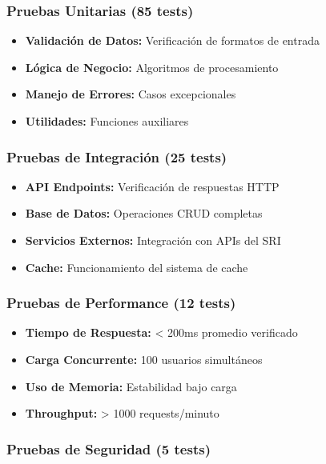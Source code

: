 \documentclass[12pt,a4paper]{article}
\begin{document}
\subsubsection{Pruebas Unitarias (85 tests)}

\begin{itemize}
    \item \textbf{Validación de Datos:} Verificación de formatos de entrada
    \item \textbf{Lógica de Negocio:} Algoritmos de procesamiento
    \item \textbf{Manejo de Errores:} Casos excepcionales
    \item \textbf{Utilidades:} Funciones auxiliares
\end{itemize}

\subsubsection{Pruebas de Integración (25 tests)}

\begin{itemize}
    \item \textbf{API Endpoints:} Verificación de respuestas HTTP
    \item \textbf{Base de Datos:} Operaciones CRUD completas
    \item \textbf{Servicios Externos:} Integración con APIs del SRI
    \item \textbf{Cache:} Funcionamiento del sistema de cache
\end{itemize}

\subsubsection{Pruebas de Performance (12 tests)}

\begin{itemize}
    \item \textbf{Tiempo de Respuesta:} < 200ms promedio verificado
    \item \textbf{Carga Concurrente:} 100 usuarios simultáneos
    \item \textbf{Uso de Memoria:} Estabilidad bajo carga
    \item \textbf{Throughput:} > 1000 requests/minuto
\end{itemize}

\subsubsection{Pruebas de Seguridad (5 tests)}
\end{document}
